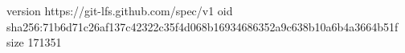 version https://git-lfs.github.com/spec/v1
oid sha256:71b6d71c26af137c42322c35f4d068b16934686352a9c638b10a6b4a3664b51f
size 171351
